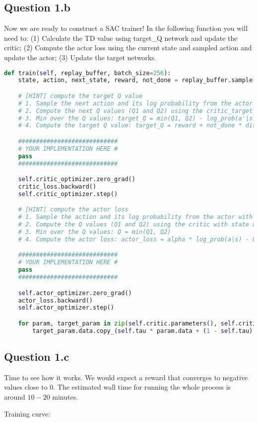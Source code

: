 \documentclass[12pt]{article}
\begin{document}
\subsection*{Question 1.b} 
Now we are ready to construct a SAC trainer! In the following function you will need to: (1) Calculate the TD value using target\_Q network and update the critic; (2) Compute the actor loss using the current state and sampled action and update the actor; (3) Update the target networks.
\begin{solution}
\begin{lstlisting}[language=Python]
def train(self, replay_buffer, batch_size=256):
    state, action, next_state, reward, not_done = replay_buffer.sample(batch_size)

    # [HINT] compute the target Q value
    # 1. Sample the next action and its log probability from the actor with next_state
    # 2. Compute the next Q values (Q1 and Q2) using the critic_target with next_state and next_action
    # 3. Min over the Q values: target_Q = min(Q1, Q2) - log_prob(a'|s') * alpha
    # 4. Compute the target Q value: target_Q = reward + not_done * discount * target_Q

    ############################
    # YOUR IMPLEMENTATION HERE #
    pass
    ############################

    self.critic_optimizer.zero_grad()
    critic_loss.backward()
    self.critic_optimizer.step()

    # [HINT] compute the actor loss
    # 1. Sample the action and its log probability from the actor with state
    # 2. Compute the Q values (Q1 and Q2) using the critic with state and action
    # 3. Min over the Q values: Q = min(Q1, Q2)
    # 4. Compute the actor loss: actor_loss = alpha * log_prob(a|s) - Q

    ############################
    # YOUR IMPLEMENTATION HERE #
    pass
    ############################

    self.actor_optimizer.zero_grad()
    actor_loss.backward()
    self.actor_optimizer.step()

    for param, target_param in zip(self.critic.parameters(), self.critic_target.parameters()):
        target_param.data.copy_(self.tau * param.data + (1 - self.tau) * target_param.data)
\end{lstlisting}
\end{solution}

\subsection*{Question 1.c} 
Time to see how it works. We would expect a reward that converges to negative values close to 0. The estimated wall time for running the whole process is around $10-20$ minutes. 
\begin{solution}
Training curve:
\end{solution}
\end{document}
